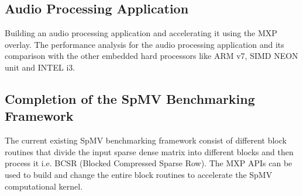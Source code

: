 \subsection{Audio Processing Application}
Building an audio processing application and accelerating it using the MXP overlay. The performance analysis for the audio processing application and its comparison with the other embedded hard processors like ARM v7, SIMD NEON unit and INTEL i3.

\subsection{Completion of the SpMV Benchmarking Framework}
The current existing SpMV benchmarking framework consist of different block routines that divide the input sparse dense matrix into different blocks and then process it i.e. BCSR (Blocked Compressed Sparse Row). The MXP APIs can be used to build and change the entire block routines to accelerate the SpMV computational kernel.  

